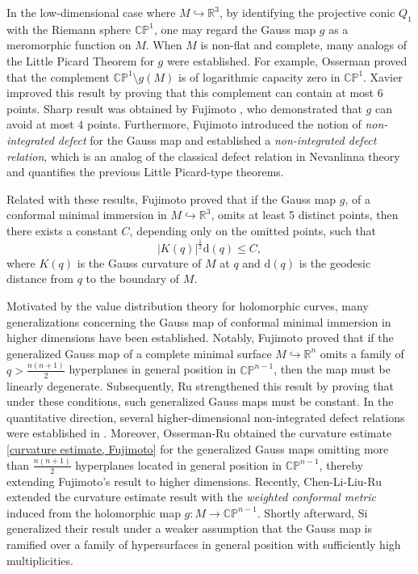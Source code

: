 \documentclass[english, 12pt]{amsart}
\theoremstyle{plain}
\theoremstyle{remark}
\numberwithin{equation}{section}
\theoremstyle{plain}
\theoremstyle{named}
\begin{document}
In the low-dimensional case where $M\hookrightarrow \mathbb{R}^3$, by identifying the projective conic $Q_1$ with the Riemann sphere $\mathbb{CP}^{1}$, one may regard the Gauss map $g$ as a meromorphic function on $M$. When $M$ is non-flat and complete,  many analogs of the Little Picard Theorem for $g$ were established. For example, Osserman \cite{Osserman64} proved that  the complement $\mathbb{C}\mathbb{P}^1\setminus g(M)$ is of logarithmic capacity zero in $\mathbb{C}\mathbb{P}^1$. Xavier \cite{Xavier81} improved this result by proving that this complement can contain  at most $6$ points. Sharp result was obtained by Fujimoto \cite{Fujimoto88}, who demonstrated that $g$ can avoid at most $4$ points. Furthermore, Fujimoto \cite{Fujimoto83_2} introduced the notion of {\sl non-integrated defect} for the Gauss map and established a {\sl non-integrated defect relation}, which is an analog of the classical defect relation in Nevanlinna theory and quantifies the previous Little Picard-type theorems.

Related with these results, Fujimoto \cite{Fujimoto88} proved that if the Gauss map $g$, of a conformal minimal immersion in $M\hookrightarrow \mathbb{R}^3$, omits at least 5 distinct points, then there exists a constant $C$, depending only on the omitted points, such that
\begin{equation}
	\label{curvature estimate, Fujimoto}
	|K(q)|^{\frac{1}{2}}\mathrm{d}(q)\leq C,
\end{equation}
where $K(q)$ is the Gauss curvature of $M$ at $q$ and $\mathrm{d}(q)$ is the geodesic distance from $q$ to the boundary of $M$.

Motivated by the value distribution theory for holomorphic curves, many generalizations concerning the Gauss map of conformal minimal immersion in higher dimensions have been established. Notably, Fujimoto \cite{Fujimoto90} proved that if the generalized Gauss map of a complete minimal surface $M\hookrightarrow\mathbb{R}^{n}$ omits a family of $q>\frac{n(n+1)}{2}$ hyperplanes in general position in $\mathbb{CP}^{n-1}$, then the map must be linearly degenerate. Subsequently, Ru \cite{Ru91} strengthened this result by proving that under these conditions, such generalized Gauss maps must be constant. In the quantitative direction, several higher-dimensional non-integrated defect relations were established in \cite{Fujimoto89, Fujimoto90, Fujimoto91}. Moreover, Osserman-Ru \cite{Osserman-Ru97} obtained the curvature estimate \eqref{curvature estimate, Fujimoto} for the generalized Gauss maps omitting more than $\frac{n(n+1)}{2}$ hyperplanes located in general position in $\mathbb{CP}^{n-1}$, thereby extending Fujimoto's result to higher dimensions. Recently, Chen-Li-Liu-Ru \cite{Chen-Li-Liu-Ru21} extended the curvature estimate result with the \emph{weighted conformal metric} induced from the holomorphic map $g\colon M\to \mathbb{CP}^{n-1}$. Shortly afterward, Si \cite{Quang2023} generalized their result under a weaker assumption that the Gauss map is ramified over a family of hypersurfaces in general position with sufficiently high multiplicities.
\end{document}

